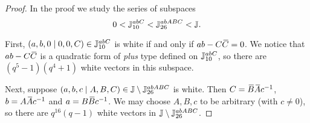 \begin{proof}
	In the proof we study the series of subspaces
	\begin{equation*}
		0 < \J_{10}^{abC} < \J_{26}^{abABC} < \J.
	\end{equation*}
	
	First, $(a,b,0\mid 0,0,C) \in \J_{10}^{abC}$ is white if and only if 
	$ab - C\ovC = 0$. We notice that $ab - C\ovC$ is a quadratic form of 
	\textit{plus} type defined on $\J_{10}^{abC}$, so there are
	$(q^5-1)(q^4+1)$ white vectors in this subspace. 
	
	Next, suppose $(a,b,c\mid A,B,C) \in \J\setminus \J_{26}^{abABC}$ is white. 
	Then $C = \ovB \ovA c^{-1}$, $b = A\ovA c^{-1}$ and $a = B\ovB c^{-1}$.
	We may choose $A,B,c$ to be arbitrary (with $c \neq 0$), so there are 
	$q^{16}(q-1)$ white vectors in $\J\setminus\J_{26}^{abABC}$.
	

\end{proof}
